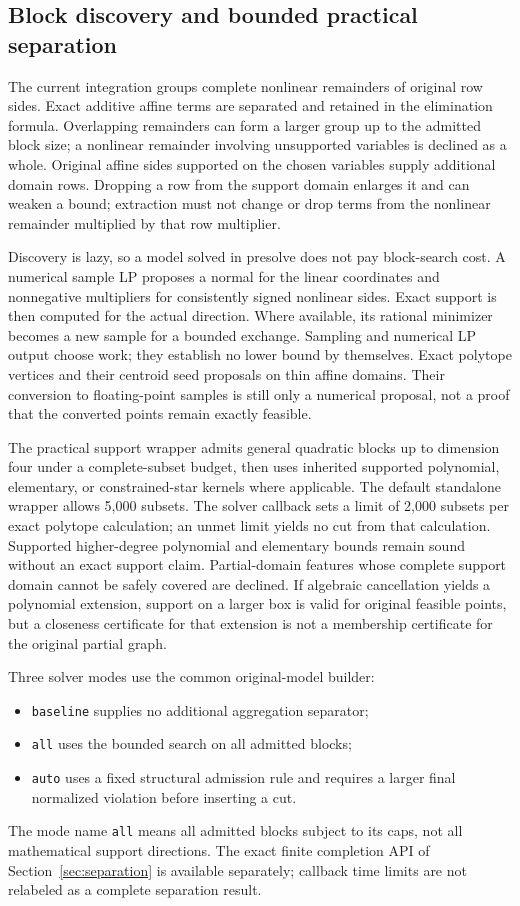 \subsection{Block discovery and bounded practical separation}

The current integration groups complete nonlinear remainders of original
row sides. Exact additive affine terms are separated and retained in the
elimination formula. Overlapping remainders can form a larger group up to
the admitted block size; a nonlinear remainder involving unsupported
variables is declined as a whole. Original affine sides supported on the
chosen variables supply additional domain rows. Dropping a row from the
support domain enlarges it and can weaken a bound; extraction must not
change or drop terms from the nonlinear remainder multiplied by that
row multiplier.

Discovery is lazy, so a model solved in presolve does not pay block-search
cost. A numerical sample LP proposes a normal for the linear coordinates
and nonnegative multipliers for consistently signed nonlinear sides. Exact
support is then computed for the actual direction. Where available, its
rational minimizer becomes a new sample for a bounded exchange. Sampling
and numerical LP output choose work; they establish no lower bound by
themselves. Exact polytope vertices and their centroid seed proposals on
thin affine domains. Their conversion to floating-point samples is still
only a numerical proposal, not a proof that the converted points remain
exactly feasible.

The practical support wrapper admits general quadratic blocks up to
dimension four under a complete-subset budget, then uses inherited supported
polynomial, elementary, or constrained-star kernels where applicable.
The default standalone wrapper allows 5,000 subsets. The solver callback
sets a limit of 2,000 subsets per exact polytope calculation; an unmet
limit yields no cut from that calculation.
Supported higher-degree polynomial and elementary bounds remain sound
without an exact support claim. Partial-domain features whose complete
support domain cannot be safely covered are declined. If algebraic
cancellation yields a polynomial extension, support on a larger box is
valid for original feasible points, but a closeness certificate for that
extension is not a membership certificate for the original partial graph.

Three solver modes use the common original-model builder:
\begin{itemize}
\item \texttt{baseline} supplies no additional aggregation separator;
\item \texttt{all} uses the bounded search on all admitted blocks;
\item \texttt{auto} uses a fixed structural admission rule and requires a
larger final normalized violation before inserting a cut.
\end{itemize}
The mode name \texttt{all} means all admitted blocks subject to its caps,
not all mathematical support directions. The exact finite completion API
of Section~\ref{sec:separation} is available separately; callback time
limits are not relabeled as a complete separation result.

